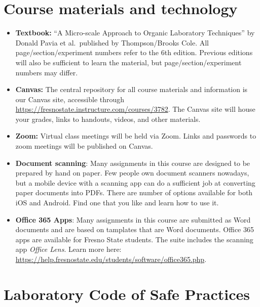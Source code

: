 \hypertarget{course-materials-and-technology}{%
\section{Course materials and
technology}\label{course-materials-and-technology}}

\begin{itemize}
\tightlist
\item
  \textbf{Textbook:} ``A Micro-scale Approach to Organic Laboratory
  Techniques'' by Donald Pavia et al.~published by Thompson/Brooks Cole.
  All page/section/experiment numbers refer to the 6th edition. Previous
  editions will also be sufficient to learn the material, but
  page/section/experiment numbers may differ.
\item
  \textbf{Canvas:} The central repository for all course materials and
  information is our Canvas site, accessible through
  \url{https://fresnostate.instructure.com/courses/3782}. The Canvas
  site will house your grades, links to handouts, videos, and other
  materials.
\item
  \textbf{Zoom:} Virtual class meetings will be held via Zoom. Links and
  passwords to zoom meetings will be published on Canvas.
\item
  \textbf{Document scanning}: Many assignments in this course are
  designed to be prepared by hand on paper. Few people own document
  scanners nowadays, but a mobile device with a scanning app can do a
  sufficient job at converting paper documents into PDFs. There are
  number of options available for both iOS and Android. Find one that
  you like and learn how to use it.
\item
  \textbf{Office 365 Apps}: Many assignments in this course are
  submitted as Word documents and are based on tamplates that are Word
  documents. Office 365 apps are available for Fresno State students.
  The suite includes the scanning app \emph{Office Lens}. Learn more
  here:
  \url{https://help.fresnostate.edu/students/software/office365.php}.
\end{itemize}

\hypertarget{laboratory-code-of-safe-practices}{%
\section{Laboratory Code of Safe
Practices}\label{laboratory-code-of-safe-practices}}

